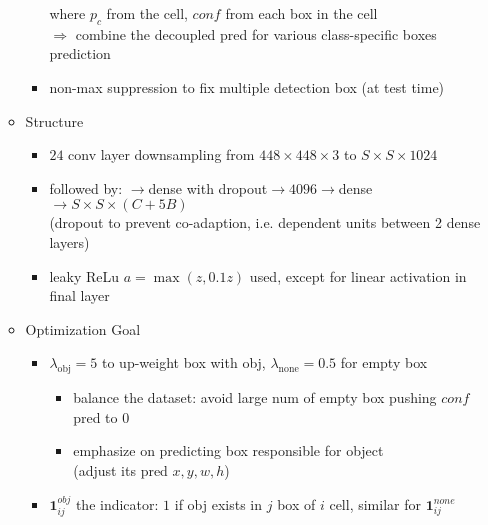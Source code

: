 \begin{itemize}
\begin{itemize}
\begin{itemize}
		where $p_c$ from the cell, $conf$ from each box in the cell \\
		$\Rightarrow$ combine the decoupled pred for various class-specific boxes prediction
		\item non-max suppression to fix multiple detection box (at test time)
		\end{itemize}
	\item Structure
		\begin{itemize}
		\item $24$ conv layer downsampling from $448\times448\times3$ to $S\times S\times 1024$
		\item followed by: $\rightarrow$dense with dropout$\rightarrow4096\rightarrow$dense$\rightarrow S\times S\times (C+5B)$ \\
		(dropout to prevent co-adaption, i.e. dependent units between 2 dense layers)
		\item leaky ReLu $a=\max(z,0.1z)$ used, except for linear activation in final layer
		\end{itemize}
	\item Optimization Goal
		\begin{itemize}
		\Item \begin{align*} \displaystyle \text{loss} = & \lambda_\text{obj}\sum_{i=0}^{S^2}\sum_{j=0}^{B} \mathbf{1}^{obj}_{ij} [(x_i-\hat x_i)^2 + (y_i-\hat y_i)^2] +\\
		& \lambda_\text{obj}\sum_{i=0}^{S^2}\sum_{j=0}^{B}\mathbf 1^{obj}_{ij} [(\sqrt{w_i}-\sqrt{\hat w_i})^2 + (\sqrt{h_i}-\sqrt{\hat h_i})^2] + \\
		& \sum_{i=0}^{S^2}\sum_{j=0}^{B}\mathbf 1^{obj}_{ij} (conf_{ij} - \hat {conf}_{ij})^2 + \lambda_\text{none}\cdot\mathbf 1^{none}_{ij} (conf_{ij} - \hat {conf}_{ij})^2 +\\
		& \sum_{i=0}^{S^2}\mathbf 1^{obj}_{i}\sum_{c=0}^C (p_{ci} - \hat p_{ci})^2 \end{align*}
		\item $\lambda_\text{obj} = 5$ to up-weight box with obj, $\lambda_\text{none}=0.5$ for empty box
			\begin{itemize}
			\item balance the dataset: avoid large num of empty box pushing $conf$ pred to $0$
			\item emphasize on predicting box responsible for object \\
			(adjust its pred $x,y,w,h$)
			\end{itemize}
		\item $\mathbf{1}^{obj}_{ij}$ the indicator: $1$ if obj exists in $j$ box of $i$ cell, similar for $\mathbf 1^{none}_{ij}$

\end{itemize}
\end{itemize}
\end{itemize}
